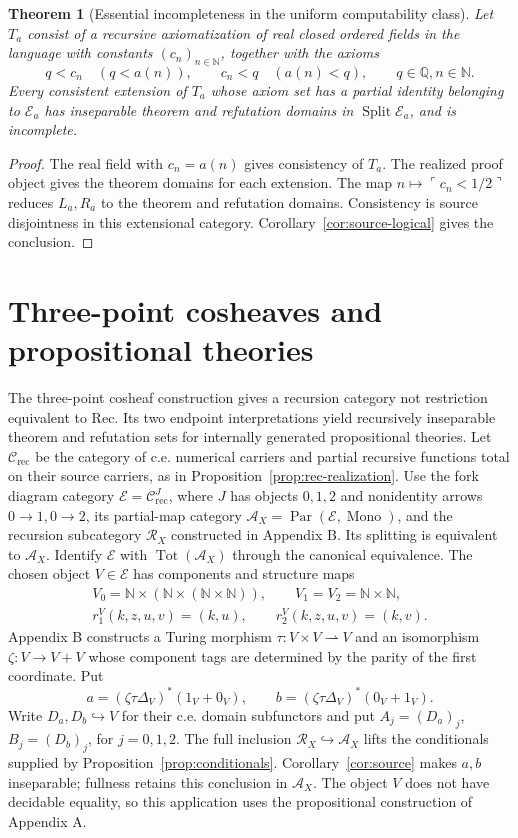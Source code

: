 \documentclass[11pt]{article}
\newtheorem{theorem}{Theorem}[section]
\theoremstyle{definition}\newtheorem{definition}[theorem]{Definition}
\newcommand{\N}{\mathbb N}
\newcommand{\Tot}{\operatorname{Tot}}
\newcommand{\Split}{\operatorname{Split}}
\newcommand{\Par}{\operatorname{Par}}
\newcommand{\R}{\mathscr R}
\newcommand{\A}{\mathcal A}
\newcommand{\E}{\mathcal E}
\begin{document}
\begin{theorem}[Essential incompleteness in the uniform computability class]\label{thm:miller-incomplete}
Let $T_a$ consist of a recursive axiomatization of real closed
ordered fields in the language with constants $(c_n)_{n\in\N}$,
together with the axioms
\[
 q<c_n\quad(q<a(n)),\qquad c_n<q\quad(a(n)<q),
 \qquad q\in\mathbb Q, n\in\N.
\]
Every consistent extension of $T_a$ whose axiom set has a partial
identity belonging to $\E_a$ has inseparable theorem and refutation
domains in $\Split\E_a$, and is incomplete.
\end{theorem}
\begin{proof}
The real field with $c_n=a(n)$ gives consistency of $T_a$.
The realized proof object gives the theorem domains for each
extension. The map $n\mapsto\ulcorner c_n<1/2\urcorner$ reduces
$L_a,R_a$ to the theorem and refutation domains. Consistency
is source disjointness in this extensional category.
Corollary~\ref{cor:source-logical} gives the conclusion.
\end{proof}

\section{Three-point cosheaves and propositional theories}
The three-point cosheaf construction gives a recursion category
not restriction equivalent to $\mathrm{Rec}$. Its two endpoint
interpretations yield recursively inseparable theorem and refutation
sets for internally generated propositional theories.
Let $\mathcal C_{\mathrm{rec}}$ be the category of c.e. numerical
carriers and partial recursive functions total on their source
carriers, as in Proposition~\ref{prop:rec-realization}.
Use the fork diagram category $\E=\mathcal C_{\mathrm{rec}}^{J}$,
where $J$ has objects $0,1,2$ and nonidentity arrows $0\to1,0\to2$,
its partial-map category
$\A_X=\Par(\E,\operatorname{Mono})$, and the recursion subcategory
$\R_X$ constructed in Appendix B. Its splitting is equivalent
to $\A_X$. Identify $\E$ with $\Tot(\A_X)$ through the canonical
equivalence. The chosen object
$V\in\E$ has components and structure maps
\[
 \begin{gathered}
 V_0=\N\times(\N\times(\N\times\N)),\qquad
 V_1=V_2=\N\times\N,\\
 r_1^V(k,z,u,v)=(k,u),\qquad
 r_2^V(k,z,u,v)=(k,v).
 \end{gathered}
\]
Appendix B constructs a Turing morphism
$\tau:V\times V\rightharpoonup V$ and an isomorphism
$\zeta:V\to V+V$ whose component tags are determined by the
parity of the first coordinate. Put
\[
 a=(\zeta\tau\Delta_V)^*(1_V+0_V),\qquad
 b=(\zeta\tau\Delta_V)^*(0_V+1_V).
\]
Write $D_a,D_b\hookrightarrow V$ for their c.e. domain subfunctors
and put $A_j=(D_a)_j$, $B_j=(D_b)_j$, for $j=0,1,2$.
The full inclusion $\R_X\hookrightarrow\A_X$ lifts the
conditionals supplied by Proposition~\ref{prop:conditionals}.
Corollary~\ref{cor:source} makes $a,b$ inseparable; fullness retains
this conclusion in $\A_X$.
The object $V$ does not have decidable equality, so this application
uses the propositional construction of Appendix A.
\end{document}
